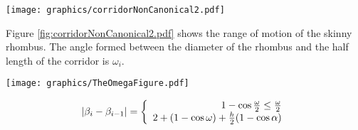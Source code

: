 \begin{minipage}{\linewidth}
\begin{center}
\texttt{[image: graphics/corridorNonCanonical2.pdf]}
\label{fig:corridorNonCanonical2.pdf}
\end{center}
\end{minipage}

Figure \ref{fig:corridorNonCanonical2.pdf} shows the range of motion of the skinny rhombus.
The angle formed between the diameter of the rhombus and the half length of the corridor is $\omega_i$.



\begin{minipage}{\linewidth}
\begin{center}
\texttt{[image: graphics/TheOmegaFigure.pdf]}
\label{fig:TheOmegaFigure.pdf}
\end{center}
\end{minipage}

\begin{equation}
\left\vert \beta_i - \beta_{i-1} \right\vert = \left\lbrace \begin{array}{r}
1 - \cos \frac{\omega}{2}\leq \frac{\omega}{2}\\
2 + (1 - \cos \omega) + \frac{h}{2} (1 - \cos \alpha)
\end{array}\right.
\end{equation}
